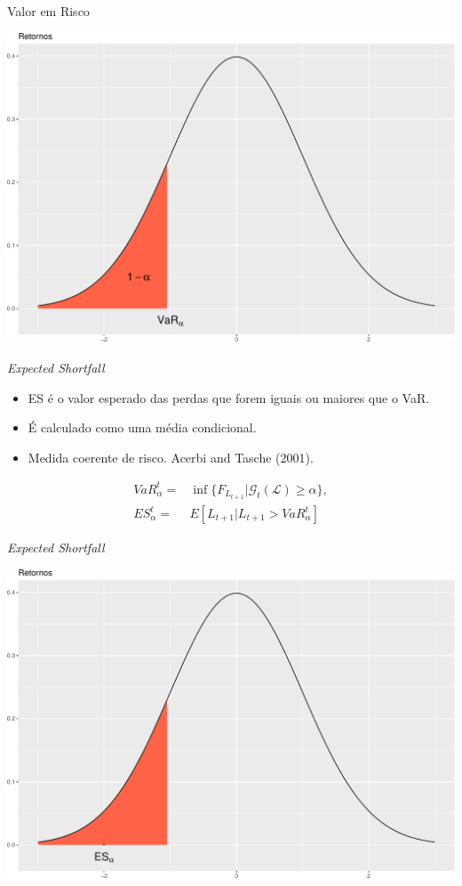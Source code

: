 \documentclass[ignorenonframetext,]{beamer}
\providecommand{\tightlist}{%
  \setlength{\itemsep}{0pt}\setlength{\parskip}{0pt}}
\begin{document}
\begin{frame}{Valor em Risco}

\includegraphics{artigo-apresentacao_files/figure-beamer/var-1.pdf}

\end{frame}

\begin{frame}{\emph{Expected Shortfall}}

\begin{itemize}
\tightlist
\item
  ES é o valor esperado das perdas que forem iguais ou maiores que o
  VaR.
\item
  É calculado como uma média condicional.
\item
  Medida coerente de risco. Acerbi and Tasche (2001).
\end{itemize}

\begin{align*}
VaR_\alpha^t=&\inf\{F_{L_{t+1}} | \mathcal{G}_t(\mathcal{L}) \geq \alpha\}, \\
ES_\alpha^t=&E[L_{t+1} | L_{t+1} > VaR_\alpha^t]
\end{align*}

\end{frame}

\begin{frame}{\emph{Expected Shortfall}}

\includegraphics{artigo-apresentacao_files/figure-beamer/ES-1.pdf}

\end{frame}
\end{document}
